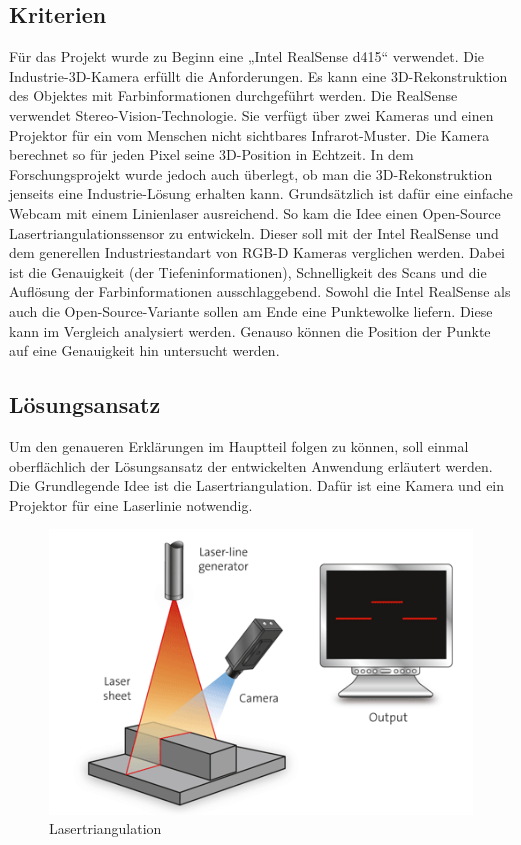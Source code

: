 	\subsection{Kriterien}
	Für das Projekt wurde zu Beginn eine „Intel RealSense d415“ verwendet. Die Industrie-3D-Kamera erfüllt die Anforderungen. Es kann eine 3D-Rekonstruktion des Objektes mit Farbinformationen durchgeführt werden. Die RealSense verwendet Stereo-Vision-Technologie. Sie verfügt über zwei Kameras und einen Projektor für ein vom Menschen nicht sichtbares Infrarot-Muster. Die Kamera berechnet so für jeden Pixel seine 3D-Position in Echtzeit. In dem Forschungsprojekt wurde jedoch auch überlegt, ob man die 3D-Rekonstruktion jenseits eine Industrie-Lösung erhalten kann. Grundsätzlich ist dafür eine einfache Webcam mit einem Linienlaser ausreichend. So kam die Idee einen Open-Source Lasertriangulationssensor zu entwickeln.
	Dieser soll mit der Intel RealSense und dem generellen Industriestandart von RGB-D Kameras verglichen werden. Dabei ist die Genauigkeit (der Tiefeninformationen), Schnelligkeit des Scans und die Auflösung der Farbinformationen ausschlaggebend. Sowohl die Intel RealSense als auch die Open-Source-Variante sollen am Ende eine Punktewolke liefern. Diese kann im Vergleich analysiert werden. Genauso können die Position der Punkte auf eine Genauigkeit hin untersucht werden. 
	
	\newpage
	
	\subsection{Lösungsansatz}
	Um den genaueren Erklärungen im Hauptteil folgen zu können, soll einmal oberflächlich der Lösungsansatz der entwickelten Anwendung erläutert werden. Die Grundlegende Idee ist die Lasertriangulation. Dafür ist eine Kamera und ein Projektor für eine Laserlinie notwendig.
	\begin{figure}[h]
		\centering
		\includegraphics[width=0.7\linewidth]{img/grundlagen/lasertriangulation_1}
		\caption{Lasertriangulation}
		\label{fig:lasertriangulation}
	\end{figure}

